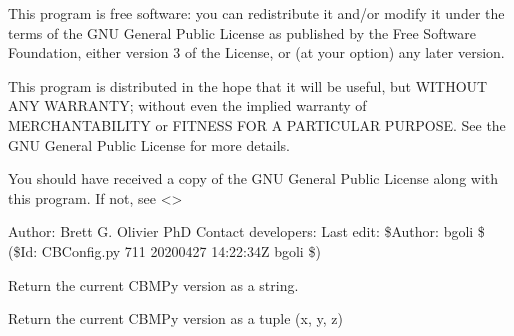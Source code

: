 \documentclass[letterpaper,12pt,english]{sphinxmanual}
\begin{document}
\sphinxAtStartPar
This program is free software: you can redistribute it and/or modify
it under the terms of the GNU General Public License as published by
the Free Software Foundation, either version 3 of the License, or
(at your option) any later version.

\sphinxAtStartPar
This program is distributed in the hope that it will be useful,
but WITHOUT ANY WARRANTY; without even the implied warranty of
MERCHANTABILITY or FITNESS FOR A PARTICULAR PURPOSE.  See the
GNU General Public License for more details.

\sphinxAtStartPar
You should have received a copy of the GNU General Public License
along with this program.  If not, see \textless{}\textgreater{}

\sphinxAtStartPar
Author: Brett G. Olivier PhD
Contact developers: 
Last edit: \$Author: bgoli \$ (\$Id: CBConfig.py 711 2020\sphinxhyphen{}04\sphinxhyphen{}27 14:22:34Z bgoli \$)

\begin{fulllineitems}
\label{\detokenize{api/core:cbmpy.CBConfig.current_version}}
\pysigstartsignatures
\pysiglinewithargsret
{}
{}
{}
\pysigstopsignatures
\sphinxAtStartPar
Return the current CBMPy version as a string.

\end{fulllineitems}


\begin{fulllineitems}
\label{\detokenize{api/core:cbmpy.CBConfig.current_version_tuple}}
\pysigstartsignatures
\pysiglinewithargsret
{}
{}
{}
\pysigstopsignatures
\sphinxAtStartPar
Return the current CBMPy version as a tuple (x, y, z)

\end{fulllineitems}

\end{document}

